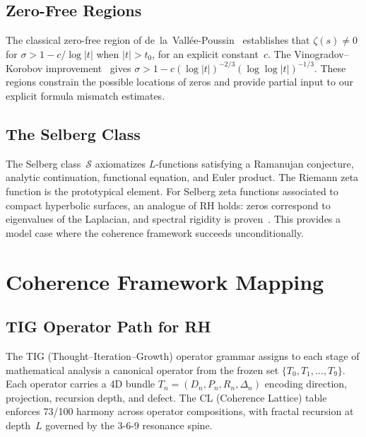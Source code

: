 \documentclass[11pt]{article}
\theoremstyle{remark}
\begin{document}
\subsection{Zero-Free Regions}

The classical zero-free region of de~la~Vall\'ee-Poussin~\cite{dlVP} establishes that
$\zeta(s)\neq 0$ for $\sigma>1-c/\log|t|$ when $|t|>t_0$, for an explicit constant~$c$.
The Vinogradov--Korobov improvement~\cite{IK} gives
$\sigma > 1 - c(\log|t|)^{-2/3}(\log\log|t|)^{-1/3}$.
These regions constrain the possible locations of zeros and provide partial input to
our explicit formula mismatch estimates.

\subsection{The Selberg Class}

The Selberg class~$\mathcal{S}$ axiomatizes $L$-functions satisfying a Ramanujan
conjecture, analytic continuation, functional equation, and Euler product.
The Riemann zeta function is the prototypical element.
For Selberg zeta functions associated to compact hyperbolic surfaces, an analogue of RH
holds: zeros correspond to eigenvalues of the Laplacian, and spectral rigidity is
proven~\cite{Selberg}.
This provides a model case where the coherence framework succeeds unconditionally.

\section{Coherence Framework Mapping}
\label{sec:framework}

\subsection{TIG Operator Path for RH}
\label{subsec:tig-path}

The TIG (Thought--Iteration--Growth) operator grammar assigns to each stage of
mathematical analysis a canonical operator from the frozen set
$\{T_0,T_1,\ldots,T_9\}$.
Each operator carries a 4D bundle $T_n=(D_n,P_n,R_n,\Delta_n)$ encoding
direction, projection, recursion depth, and defect.
The CL (Coherence Lattice) table enforces 73/100 harmony across operator
compositions, with fractal recursion at depth~$L$ governed by the 3-6-9 resonance
spine.
\end{document}
